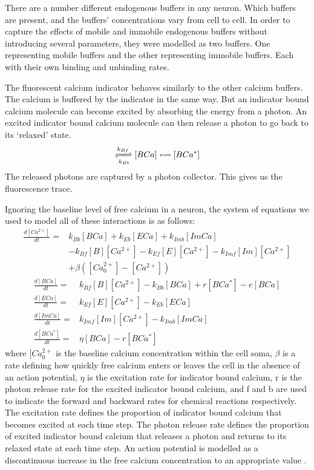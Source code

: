 \documentclass[a4paper,12pt]{article}
\theoremstyle{definition}
\newcommand{\diff}[2]{\frac{d #1}{d #2}}%
\begin{document}
There are a number different endogenous buffers in any neuron. Which buffers are present, and the buffers’ concentrations vary from cell to cell. In order to capture the effects of mobile and immobile endogenous buffers without introducing several parameters, they were modelled as two buffers. One representing mobile buffers and the other representing immobile buffers. Each with their own binding and unbinding rates.

The fluorescent calcium indicator behaves similarly to the other calcium buffers. The calcium is buffered by the indicator in the same way. But an indicator bound calcium molecule can become excited by absorbing the energy from a photon. An excited indicator bound calcium molecule can then release a photon to go back to its ‘relaxed’ state.
\begin{align*}
    [B][Ca^{2+}] \xrightleftharpoons[k_{Bb}]{k_{Bf}} [BCa] \leftrightsquigarrow [BCa^{\ast}]
\end{align*}
The released photons are captured by a photon collector. This gives us the fluorescence trace.

Ignoring the baseline level of free calcium in a neuron, the system of equations we used to model all of these interactions is as follows:
\begin{equation} \label{eq:model_equations}
  \begin{split}
  \diff{[Ca^{2+}]}{t} = & k_{Bb}[BCa] + k_{Eb}[ECa] + k_{Imb}[ImCa] \\
                      & - k_{Bf}[B][Ca^{2+}]- k_{Ef} [E][Ca^{2+}] - k_{Imf}[Im][Ca^{2+}] \\
                      & + \beta ([Ca^{2+}_{0}] - [Ca^{2+}])
  \end{split}
\end{equation}
\begin{align}
  \diff{[BCa]}{t} = & k_{Bf}[B][Ca^{2+}] - k_{Bb}[BCa] + r[BCa^{*}] - e[BCa] \\
  \diff{[ECa]}{t} = & k_{Ef}[E][Ca^{2+}] - k_{Eb}[ECa] \\
  \diff{[ImCa]}{t} = & k_{Imf}[Im][Ca^{2+}] - k_{Imb}[ImCa] \\
  \diff{[BCa^{*}]}{t} = & \eta[BCa] - r[BCa^{*}]
\end{align}
where $[Ca^{2+}_{0}$ is the baseline calcium concentration within the cell soma, $\beta$ is a rate defining how quickly free calcium enters or leaves the cell in the absence of an action potential, $\eta$ is the excitation rate for indicator bound calcium, r is the photon release rate for the excited indicator bound calcium, and f and b are used to indicate the forward and backward rates for chemical reactions respectively. The excitation rate defines the proportion of indicator bound calcium that becomes excited at each time step. The photon release rate defines the proportion of excited indicator bound calcium that releases a photon and returns to its relaxed state at each time step. An action potential is modelled as a discontinuous increase in the free calcium concentration to an appropriate value \cite{maravall}.
\end{document}
